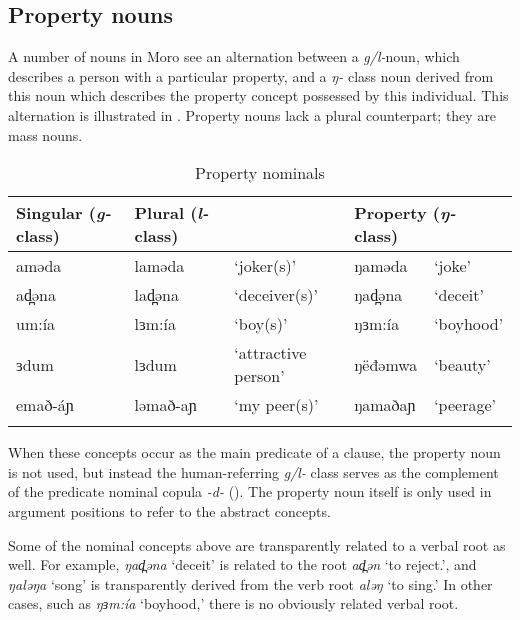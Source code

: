 \subsection{Property nouns}\label{sec:ch6:pcnominal}

A number of nouns in Moro see an alternation between a \textit{g/l-}noun, which describes a person with a particular property, and a \textit{ŋ-} class noun derived from this noun which describes the property concept possessed by this individual. This alternation is illustrated in . Property nouns lack a plural counterpart; they are mass nouns.

\begin{table}
\caption{Property nominals}\label{tab:ch6:property}
\begin{tabular}{lllll} %
\lsptoprule
 Singular (\textit{g-} class) &  Plural (\textit{l-} class) &  & \multicolumn{2}{l}{Property (\textit{ŋ-} class)}  \\
\midrule 
aməda	&  laməda	& `joker(s)' & ŋaməda & `joke'\\
ad̪əna	& 	lad̪əna	& `deceiver(s)'& ŋad̪əna & `deceit' \\
um:ía	& 	lɜm:ía	&  `boy(s)'	& ŋɜm:ía	& `boyhood' \\
ɜdum	& 	lɜdum	&  `attractive person'	& ŋëđǝmwa	& `beauty' \\ 
emað-áɲ & ləmað-aɲ & `my peer(s)' & ŋamaðaɲ & `peerage' \\
\lspbottomrule
\end{tabular}
\end{table}
When these concepts occur as the main predicate of a clause, the property noun is not used, but instead the human-referring \textit{g/l-} class serves as the complement of the predicate nominal copula \textit{-d-} (). The property noun itself is only used in argument positions to refer to the abstract concepts. 

Some of the nominal concepts above are transparently related to a verbal root as well. For example, \textit{ŋad̪əna} `deceit' is related to the root \textit{ad̪ən} `to reject.', and \textit{ŋaləŋa} `song' is transparently derived from the verb root \textit{aləŋ} `to sing.' In other cases, such as \textit{ŋɜm:ía} `boyhood,' there is no obviously related verbal root.



